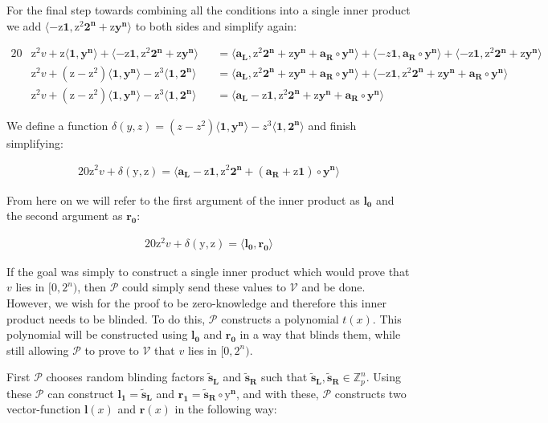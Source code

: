\documentclass{article}
\newcommand{\eq}[1]{\begin{alignat*}{20}#1\end{alignat*}}
\renewcommand{\vec}[1]{\boldsymbol{#1}}
\newcommand{\ran}[1]{\mathrm{#1}}
\newcommand{\vecran}[1]{\mathbf{#1}}
\newcommand{\V}{\mathcal{V}}
\renewcommand{\P}{\mathcal{P}}
\newcommand{\Z}{\mathbb{Z}}
\newcommand{\dotp}[2]{\langle #1, #2 \rangle}
\newcommand{\opn}[1]{\operatorname{#1}}
\newcommand{\vecl}[1]{\vec{#1_{\opn{L}}}}
\newcommand{\vecr}[1]{\vec{#1_{\opn{R}}}}
\newcommand{\blind}[1]{\widetilde{#1}}
\newcommand{\bs}{\blind{s}}
\begin{document}
For the final step towards combining all the conditions into a single
inner product we add $\dotp{-\ran{z}\vec{1}}{\ran{z^2}\vec{2^n} +
\ran{z}\vecran{y}^{\vec{n}}}$ to both sides and simplify again:

\eq{
	&\ran{z^2}v + \ran{z}\dotp{\vec{1}}{\vecran{y}^{\vec{n}}} + \dotp{-\ran{z}\vec{1}}{\ran{z^2}\vec{2^n} + \ran{z}\vecran{y}^{\vec{n}}}
	&&= \dotp{\vecl{a}}{\ran{z^2}\vec{2^n} + \ran{z}\vecran{y}^{\vec{n}} + \vecr{a}\circ \vecran{y}^{\vec{n}}} +
	\dotp{-z\vec{1}}{\vecr{a}\circ\vecran{y}^{\vec{n}}} + \dotp{-\ran{z}\vec{1}}{\ran{z^2}\vec{2^n} + \ran{z}\vecran{y}^{\vec{n}}} \\ 
	&\ran{z^2}v + (\ran{z} - \ran{z^2})\dotp{\vec{1}}{\vecran{y}^{\vec{n}}} - \ran{z^3}\dotp{\vec{1}}{\vec{2^n}} &&= \dotp{\vecl{a}}{\ran{z^2}\vec{2^n} + \ran{z}\vecran{y}^{\vec{n}} + \vecr{a}\circ \vecran{y}^{\vec{n}}} + \dotp{-\ran{z}\vec{1}}{\ran{z^2}\vec{2^n}+\ran{z}\vecran{y}^{\vec{n}} + \vecr{a}\circ\vecran{y}^{\vec{n}}}
	\\
	&\ran{z^2}v + (\ran{z} - \ran{z^2})\dotp{\vec{1}}{\vecran{y}^{\vec{n}}} - \ran{z^3}\dotp{\vec{1}}{\vec{2^n}} &&= \dotp{\vecl{a}- \ran{z}\vec{1}}{\ran{z^2}\vec{2^n} + \ran{z}\vecran{y}^{\vec{n}} + \vecr{a}\circ \vecran{y}^{\vec{n}}}
}

We define a function $\delta(y,z) = (z - z^2)\dotp{\vec{1}}{\vec{y^n}}
- z^3\dotp{\vec{1}}{\vec{2^n}}$ and finish simplifying:

\eq{
	\ran{z^2}v + \delta(\ran{y},\ran{z}) = \dotp{\vecl{a} - \ran{z}\vec{1}}{\ran{z^2}\vec{2^n} + (\vecr{a} + \ran{z}\vec{1})\circ\vecran{y}^{\vec{n}}}
}

From here on we will refer to the first argument of the inner product
as $\vec{l_0}$ and the second argument as $\vec{r_0}$:

\eq{
	\ran{z^2}v + \delta(\ran{y},\ran{z}) = \dotp{\vec{l_0}}{\vec{r_0}}
}

If the goal was simply to construct a single inner product which
would prove that $v$ lies in $[0,2^n)$, then $\P$ could simply send
these values to $\V$ and be done. However, we wish for the proof to be
zero-knowledge and therefore this inner product needs to be blinded. To
do this, $\P$ constructs a polynomial $t(x)$. This polynomial will
be constructed using $\vec{l_0}$ and $\vec{r_0}$ in a way that blinds
them, while still allowing $\P$ to prove to $\V$ that $v$ lies in
$[0,2^n)$.

First $\P$ chooses random blinding factors $\vecl{\blind{s}}$ and
$\vecr{\bs}$ such that $\vecl{\bs},\vecr{\bs}\in \Z^n_p$. Using
these $\P$ can construct $\vec{l_1} = \vecl{\bs}$ and $\vec{r_1} =
\vecr{\bs}\circ \vec{\ran{y}^n}$, and with these, $\P$ constructs two
vector-function $\vec{l}(x)$ and $\vec{r}(x)$ in the following way:
\end{document}
